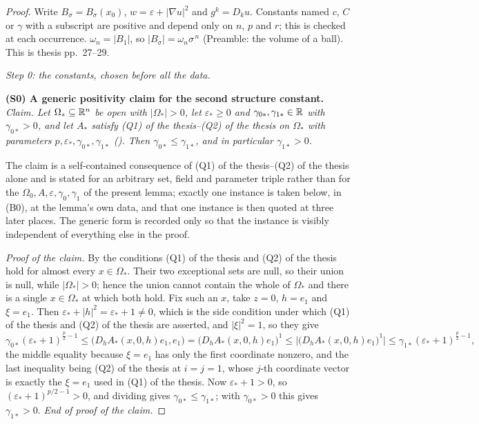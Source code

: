 \begin{proof}
Write $B_\sigma=B_\sigma(x_0)$, $w=\varepsilon+|\nabla u|^2$ and $g^k=D_ku$.
Constants named $c$, $C$ or $\gamma$ with a subscript are positive and depend
only on $n$, $p$ and $r$; this is checked at each occurrence.
$\omega_n=|B_1|$, so $|B_\sigma|=\omega_n\sigma^{\,n}$ (Preamble: the volume of
a ball).  This is thesis pp.~27--29.

\medskip
\noindent\emph{Step 0: the constants, chosen before all the data.}

\textbf{(S0) A generic positivity claim for the second structure constant.}
\emph{Claim.  Let $\Omega_\ast\subseteq\mathbb{R}^n$ be open with $|\Omega_\ast|>0$, let
$\varepsilon_\ast\ge0$ and $\gamma_{0\ast},\gamma_{1\ast}\in\mathbb{R}$ with
$\gamma_{0\ast}>0$, and let $A_\ast$ satisfy (Q1) of the thesis--(Q2) of the thesis on
$\Omega_\ast$ with parameters $p,\varepsilon_\ast,\gamma_{0\ast},\gamma_{1\ast}$
().  Then $\gamma_{0\ast}\le\gamma_{1\ast}$, and in
particular $\gamma_{1\ast}>0$.}

The claim is a self-contained consequence of
(Q1) of the thesis--(Q2) of the thesis alone and is stated for an arbitrary set, field
and parameter triple rather than for the $\Omega_0,A,\varepsilon,\gamma_0,
\gamma_1$ of the present lemma; exactly one instance is taken below, in (B0),
at the lemma's own data, and that one instance is then quoted at three later
places.  The generic form is recorded only so that the instance is visibly
independent of everything else in the proof.

\emph{Proof of the claim.}  By  the conditions
(Q1) of the thesis and (Q2) of the thesis hold for almost every $x\in\Omega_\ast$.  Their
two exceptional sets are null, so their union is null, while
$|\Omega_\ast|>0$; hence the union cannot contain the whole of $\Omega_\ast$ and
there is a single $x\in\Omega_\ast$ at which both hold.  Fix such an $x$, take
$z=0$, $h=e_1$ and $\xi=e_1$.  Then
$\varepsilon_\ast+|h|^2=\varepsilon_\ast+1\ne0$, which is the side condition
under which (Q1) of the thesis and (Q2) of the thesis are asserted, and $|\xi|^2=1$, so
they give
\[
\gamma_{0\ast}(\varepsilon_\ast+1)^{\frac p2-1}
\le\bigl(D_hA_\ast(x,0,h)e_1,e_1\bigr)=\bigl(D_hA_\ast(x,0,h)e_1\bigr)^1
\le\bigl|\bigl(D_hA_\ast(x,0,h)e_1\bigr)^1\bigr|
\le\gamma_{1\ast}(\varepsilon_\ast+1)^{\frac p2-1},
\]
the middle equality because $\xi=e_1$ has only the first coordinate nonzero, and
the last inequality being (Q2) of the thesis at $i=j=1$, whose $j$-th coordinate
vector is exactly the $\xi=e_1$ used in (Q1) of the thesis.  Now
$\varepsilon_\ast+1>0$, so $(\varepsilon_\ast+1)^{p/2-1}>0$, and dividing gives
$\gamma_{0\ast}\le\gamma_{1\ast}$; with $\gamma_{0\ast}>0$ this gives
$\gamma_{1\ast}>0$.  \emph{End of proof of the claim.}


\end{proof}
